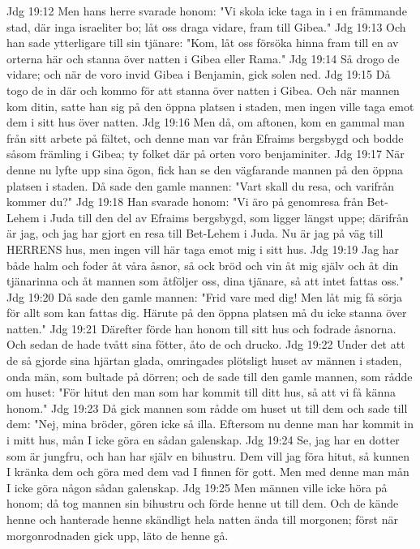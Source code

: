 Jdg 19:12  Men hans herre svarade honom: "Vi skola icke taga in i en främmande stad, där inga israeliter bo; låt oss draga vidare, fram till Gibea."
Jdg 19:13  Och han sade ytterligare till sin tjänare: "Kom, låt oss försöka hinna fram till en av orterna här och stanna över natten i Gibea eller Rama."
Jdg 19:14  Så drogo de vidare; och när de voro invid Gibea i Benjamin, gick solen ned.
Jdg 19:15  Då togo de in där och kommo för att stanna över natten i Gibea. Och när mannen kom ditin, satte han sig på den öppna platsen i staden, men ingen ville taga emot dem i sitt hus över natten.
Jdg 19:16  Men då, om aftonen, kom en gammal man från sitt arbete på fältet, och denne man var från Efraims bergsbygd och bodde såsom främling i Gibea; ty folket där på orten voro benjaminiter.
Jdg 19:17  När denne nu lyfte upp sina ögon, fick han se den vägfarande mannen på den öppna platsen i staden. Då sade den gamle mannen: "Vart skall du resa, och varifrån kommer du?"
Jdg 19:18  Han svarade honom: "Vi äro på genomresa från Bet-Lehem i Juda till den del av Efraims bergsbygd, som ligger längst uppe; därifrån är jag, och jag har gjort en resa till Bet-Lehem i Juda. Nu är jag på väg till HERRENS hus, men ingen vill här taga emot mig i sitt hus.
Jdg 19:19  Jag har både halm och foder åt våra åsnor, så ock bröd och vin åt mig själv och åt din tjänarinna och åt mannen som åtföljer oss, dina tjänare, så att intet fattas oss."
Jdg 19:20  Då sade den gamle mannen: "Frid vare med dig! Men låt mig få sörja för allt som kan fattas dig. Härute på den öppna platsen må du icke stanna över natten."
Jdg 19:21  Därefter förde han honom till sitt hus och fodrade åsnorna. Och sedan de hade tvått sina fötter, åto de och drucko.
Jdg 19:22  Under det att de så gjorde sina hjärtan glada, omringades plötsligt huset av männen i staden, onda män, som bultade på dörren; och de sade till den gamle mannen, som rådde om huset: "För hitut den man som har kommit till ditt hus, så att vi få känna honom."
Jdg 19:23  Då gick mannen som rådde om huset ut till dem och sade till dem: "Nej, mina bröder, gören icke så illa. Eftersom nu denne man har kommit in i mitt hus, mån I icke göra en sådan galenskap.
Jdg 19:24  Se, jag har en dotter som är jungfru, och han har själv en bihustru. Dem vill jag föra hitut, så kunnen I kränka dem och göra med dem vad I finnen för gott. Men med denne man mån I icke göra någon sådan galenskap.
Jdg 19:25  Men männen ville icke höra på honom; då tog mannen sin bihustru och förde henne ut till dem. Och de kände henne och hanterade henne skändligt hela natten ända till morgonen; först när morgonrodnaden gick upp, läto de henne gå.
